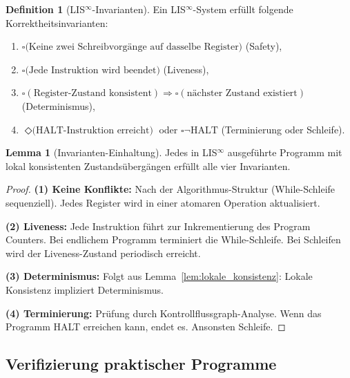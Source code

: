 \documentclass[a4paper,12pt]{article}
\theoremstyle{definition}
\newtheorem{definition}{Definition}
\newtheorem{lemma}{Lemma}
\begin{document}
	\begin{definition}[LIS$^{\infty}$-Invarianten]
		\label{def:lis_invarianten}
		Ein LIS$^{\infty}$-System erfüllt folgende Korrektheitsinvarianten:
		\begin{enumerate}
			\item $\square \text{(Keine zwei Schreibvorgänge auf dasselbe Register)}$ (Safety),
			\item $\square \text{(Jede Instruktion wird beendet)}$ (Liveness),
			\item $\square (\text{Register-Zustand konsistent}) \Rightarrow \square (\text{nächster Zustand existiert})$ (Determinismus),
			\item $\Diamond \text{(HALT-Instruktion erreicht)}$ oder $\square \neg \text{HALT}$ (Terminierung oder Schleife).
		\end{enumerate}
	\end{definition}
	
	\begin{lemma}[Invarianten-Einhaltung]
		\label{lem:invarianten}
		Jedes in LIS$^{\infty}$ ausgeführte Programm mit lokal konsistenten Zustandsübergängen erfüllt alle vier Invarianten.
	\end{lemma}
	
	\begin{proof}
		\textbf{(1) Keine Konflikte:} Nach der Algorithmus-Struktur (While-Schleife sequenziell). Jedes Register wird in einer atomaren Operation aktualisiert.
		
		\textbf{(2) Liveness:} Jede Instruktion führt zur Inkrementierung des Program Counters. Bei endlichem Programm terminiert die While-Schleife. Bei Schleifen wird der Liveness-Zustand periodisch erreicht.
		
		\textbf{(3) Determinismus:} Folgt aus Lemma~\ref{lem:lokale_konsistenz}: Lokale Konsistenz impliziert Determinismus.
		
		\textbf{(4) Terminierung:} Prüfung durch Kontrollflussgraph-Analyse. Wenn das Programm HALT erreichen kann, endet es. Ansonsten Schleife.
	\end{proof}
	
	\subsection{Verifizierung praktischer Programme}
	
\end{document}
